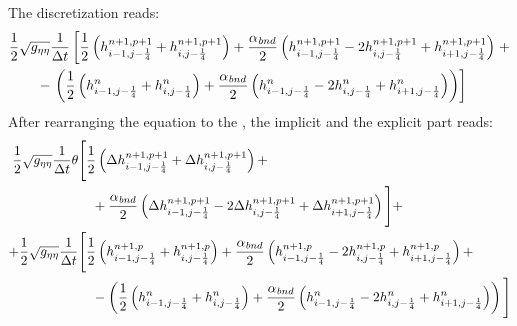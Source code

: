 The discretization reads:
%
\begin{align}
    & \frac{1}{2} \sqrt{g_{\eta\eta}} \frac{1}{\Delta t}\left[ \frac{1}{2} \left( h^{n+1,p+1}_{i-1, j-\frac{1}{4}} + h^{n+1,p+1}_{i, j-\frac{1}{4}} \right)
    + \frac{\alpha_{\mathit bnd}}{2} \left( h^{n+1,p+1}_{i-1, j-\frac{1}{4}} - 2 h^{n+1,p+1}_{i, j-\frac{1}{4}} + h^{n+1,p+1}_{i+1, j-\frac{1}{4}}  \right) \right. +
    \nonumber \\*
    & \qquad  - \left. \left(
    \frac{1}{2} \left( h^{n}_{i-1, j-\frac{1}{4}} + h^{n}_{i, j-\frac{1}{4}} \right)
    + \frac{\alpha_{\mathit bnd}}{2}  \left( h^{n}_{i-1, j-\frac{1}{4}} - 2 h^{n}_{i, j-\frac{1}{4}} + h^{n}_{i+1, j-\frac{1}{4}}  \right) \right)
    \right]
\end{align}
After rearranging the equation to the \deltaformulation, the implicit and the explicit part reads:
\begin{align}
    \frac{1}{2} \sqrt{g_{\eta\eta}} \frac{1}{\Delta t}  \theta &\Bigg[ \frac{1}{2} \left( \Delta h^{n+1, p+1}_{i-1, j-\frac{1}{4}} + \Delta h^{n+1, p+1}_{i, j-\frac{1}{4}} \right) +
    \nonumber \\*
    & \quad + \frac{\alpha_{\mathit bnd}}{2} \left( \Delta h^{n+1,p+1}_{i-1, j-\frac{1}{4}} - 2 \Delta h^{n+1,p+1}_{i, j-\frac{1}{4}} + \Delta h^{n+1,p+1}_{i+1, j-\frac{1}{4}} \right) \Bigg] +
    \nonumber \\
    + \frac{1}{2} \sqrt{g_{\eta\eta}} \frac{1}{\Delta t} & \Bigg[ \frac{1}{2} \left( h^{n+1, p}_{i-1, j-\frac{1}{4}} + h^{n+1, p}_{i, j-\frac{1}{4}} \right)
    + \frac{\alpha_{\mathit bnd}}{2}\left(  h^{n+1,p}_{i-1, j-\frac{1}{4}} - 2 h^{n+1,p}_{i, j-\frac{1}{4}}  + h^{n+1,p}_{i+1, j-\frac{1}{4}} \right) +
    \nonumber \\*
    &
    \quad  - \left( \frac{1}{2} \left( h^{n}_{i-1, j-\frac{1}{4}} + h^{n}_{i, j-\frac{1}{4}} \right)
    + \frac{\alpha_{\mathit bnd}}{2}  \left( h^{n}_{i-1, j-\frac{1}{4}} - 2 h^{n}_{i, j-\frac{1}{4}} + h^{n}_{i+1, j-\frac{1}{4}}  \right) \right) \Bigg]
\end{align}
